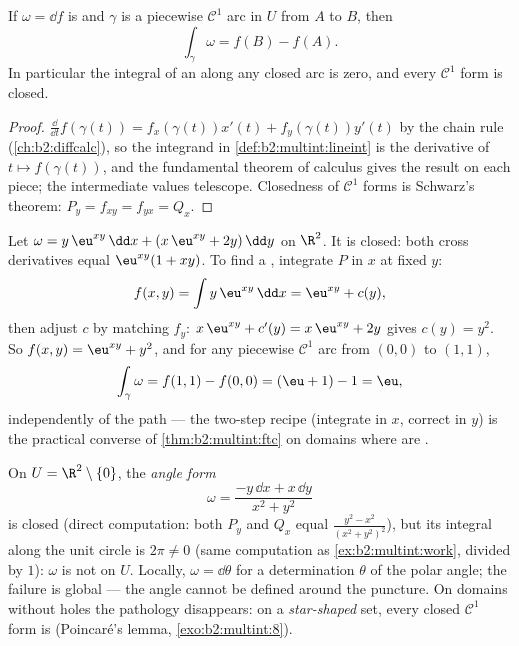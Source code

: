 \begin{theorem}\label{thm:b2:multint:ftc}
If $\omega = \dd f$ is  and $\gamma$ is a piecewise
$\mathcal{C}^1$ arc in $U$ from $A$ to $B$, then
\[
\int_\gamma \omega = f(B) - f(A) .
\]
In particular the integral of an  along any closed arc
is zero, and every  $\mathcal{C}^1$ form is closed.
\end{theorem}

\begin{proof}
$\frac{\dd}{\dd t}f(\gamma(t)) = f_x(\gamma(t))x'(t) +
f_y(\gamma(t))y'(t)$ by the chain rule
(\cref{ch:b2:diffcalc}), so the integrand in
\cref{def:b2:multint:lineint} is the derivative of $t \mapsto
f(\gamma(t))$, and the fundamental theorem of calculus gives the
result on each piece; the intermediate values telescope. Closedness
of  $\mathcal{C}^1$ forms is Schwarz's theorem: $P_y =
f_{xy} = f_{yx} = Q_x$.
\end{proof}

\begin{example}\label{ex:b2:multint:potential}
Let $\omega = y\,\eu^{xy}\,\dd x + (x\,\eu^{xy} + 2y)\,\dd y$
on $\R^2$. It is closed: both cross derivatives equal
$\eu^{xy}(1 + xy)$. To find a , integrate $P$ in
$x$ at fixed $y$:
\[
f(x, y) = \int y\,\eu^{xy}\,\dd x = \eu^{xy} + c(y),
\]
then adjust $c$ by matching $f_y$: $x\,\eu^{xy} + c'(y) =
x\,\eu^{xy} + 2y$ gives $c(y) = y^2$. So $f(x,y) = \eu^{xy} +
y^2$, and for any piecewise $\mathcal C^1$ arc from $(0,0)$
to $(1,1)$,
\[
\int_\gamma\omega = f(1,1) - f(0,0) = (\eu + 1) - 1 = \eu ,
\]
independently of the path --- the two-step recipe (integrate
in $x$, correct in $y$) is the practical converse of
\cref{thm:b2:multint:ftc} on domains where  are
.
\end{example}

\begin{example}\label{ex:b2:multint:angleform}
On $U = \R^2 \setminus \{0\}$, the \emph{angle form}
\[
\omega = \frac{-y\,\dd x + x\,\dd y}{x^2 + y^2}
\]
is closed (direct computation: both $P_y$ and $Q_x$ equal
$\frac{y^2 - x^2}{(x^2+y^2)^2}$), but its integral along the unit
circle is $2\pi \neq 0$ (same computation as
\cref{ex:b2:multint:work}, divided by $1$): $\omega$ is not 
on $U$. Locally, $\omega = \dd\theta$ for a determination
$\theta$ of the polar angle; the failure is global --- the angle
cannot be defined  around the puncture. On domains
without holes the pathology disappears: on a \emph{star-shaped}
 set, every closed $\mathcal{C}^1$ form is 
(Poincaré's lemma, \cref{exo:b2:multint:8}).
\end{example}

